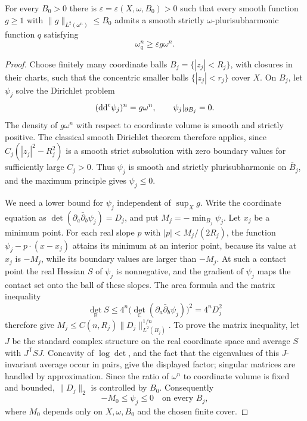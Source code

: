 \begin{proposition}\label{prop:weak-uniform-test-potentials}
For every $B_0>0$ there is $\varepsilon=\varepsilon(X,\omega,B_0)>0$ such that every smooth function $g\geq1$ with $\|g\|_{L^2(\omega^n)}\leq B_0$ admits a smooth strictly $\omega$-plurisubharmonic function $q$ satisfying
\begin{equation}\label{eq:weak-uniform-test-determinant}
\omega_q^n\geq\varepsilon g \omega^n.
\end{equation}
\end{proposition}

\begin{proof}
Choose finitely many coordinate balls $B_j=\{|z_j|<R_j\}$, with closures in their charts, such that the concentric smaller balls $\{|z_j|<r_j\}$ cover $X$. On $B_j$, let $\psi_j$ solve the Dirichlet problem
\begin{equation}\label{eq:weak-local-dirichlet}
(\mathrm{dd}^{\mathrm{c}}\psi_j)^n=g\omega^n,\qquad \psi_j|_{\partial B_j}=0.
\end{equation}
The density of $g\omega^n$ with respect to coordinate volume is smooth and strictly positive. The classical smooth Dirichlet theorem therefore applies, since $C_j(|z_j|^2-R_j^2)$ is a smooth strict subsolution with zero boundary values for sufficiently large $C_j>0$. Thus $\psi_j$ is smooth and strictly plurisubharmonic on $\overline B_j$, and the maximum principle gives $\psi_j\leq0$.

We need a lower bound for $\psi_j$ independent of $\sup_Xg$. Write the coordinate equation as $\det(\partial_a\bar\partial_b\psi_j)=D_j$, and put $M_j=-\min_{B_j}\psi_j$. Let $x_j$ be a minimum point. For each real slope $p$ with $|p|<M_j/(2R_j)$, the function $\psi_j-p\cdot(x-x_j)$ attains its minimum at an interior point, because its value at $x_j$ is $-M_j$, while its boundary values are larger than $-M_j$. At such a contact point the real Hessian $S$ of $\psi_j$ is nonnegative, and the gradient of $\psi_j$ maps the contact set onto the ball of these slopes. The area formula and the matrix inequality
\[
\det_{\mathbb R}S\leq4^n\bigl(\det_{\mathbb C}(\partial_a\bar\partial_b\psi_j)\bigr)^2=4^nD_j^2
\]
therefore give $M_j\leq C(n,R_j)\|D_j\|_{L^2(B_j)}^{1/n}$. To prove the matrix inequality, let $J$ be the standard complex structure on the real coordinate space and average $S$ with $J^\mathsf TSJ$. Concavity of $\log\det$, and the fact that the eigenvalues of this $J$-invariant average occur in pairs, give the displayed factor; singular matrices are handled by approximation. Since the ratio of $\omega^n$ to coordinate volume is fixed and bounded, $\|D_j\|_2$ is controlled by $B_0$. Consequently
\begin{equation}\label{eq:weak-local-uniform-sup}
-M_0\leq\psi_j\leq0\quad\text{on every }B_j,
\end{equation}
where $M_0$ depends only on $X,\omega,B_0$ and the chosen finite cover.


\end{proof}
